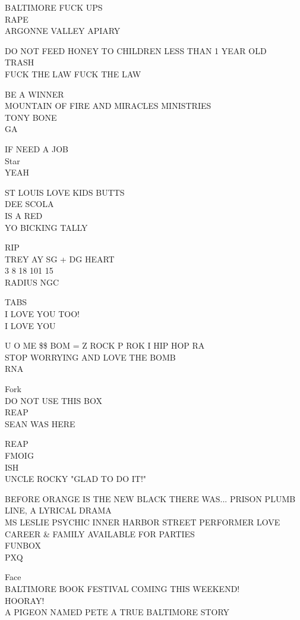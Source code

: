 \documentclass[10pt,letterpaper]{article}
\begin{document}
BALTIMORE FUCK UPS\\
RAPE\\
ARGONNE VALLEY APIARY

DO NOT FEED HONEY TO CHILDREN LESS THAN 1 YEAR OLD\\
TRASH\\
FUCK THE LAW FUCK THE LAW

BE A WINNER\\
MOUNTAIN OF FIRE AND MIRACLES MINISTRIES\\
TONY BONE\\
GA

IF NEED A JOB\\
Star\\
YEAH

ST LOUIS LOVE KIDS BUTTS\\
DEE SCOLA\\
IS A RED\\
YO BICKING TALLY

RIP\\
TREY AY SG + DG HEART\\
3 8 18 101 15\\
RADIUS NGC

TABS\\
I LOVE YOU TOO!\\
I LOVE YOU

U O ME \$\$ BOM = Z ROCK P ROK I HIP HOP RA\\
STOP WORRYING AND LOVE THE BOMB\\
RNA

Fork\\
DO NOT USE THIS BOX\\
REAP\\
SEAN WAS HERE

REAP\\
FMOIG\\
ISH\\
UNCLE ROCKY "GLAD TO DO IT!"

BEFORE ORANGE IS THE NEW BLACK THERE WAS... PRISON PLUMB LINE, A LYRICAL DRAMA\\
MS LESLIE PSYCHIC INNER HARBOR STREET PERFORMER LOVE CAREER \& FAMILY AVAILABLE FOR PARTIES\\
FUNBOX\\
PXQ

Face\\
BALTIMORE BOOK FESTIVAL COMING THIS WEEKEND!\\
HOORAY!\\
A PIGEON NAMED PETE A TRUE BALTIMORE STORY
\end{document}
